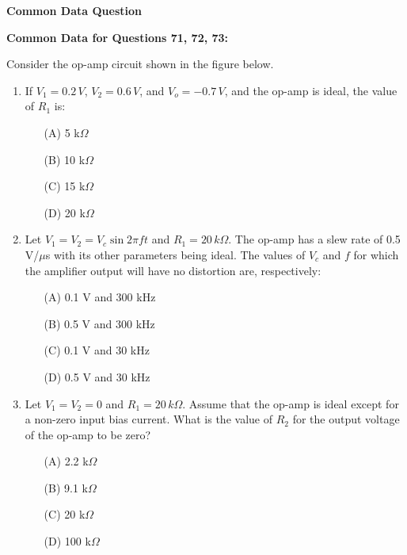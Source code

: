 \documentclass[journal]{IEEEtran}
\begin{document}
\begin{enumerate}
\begin{center}
\textbf{Common Data Question}
\end{center}

\textbf{Common Data for Questions 71, 72, 73:}

Consider the op-amp circuit shown in the figure below.
\begin{enumerate}
  \item If \( V_1 = 0.2\,V \), \( V_2 = 0.6\,V \), and \( V_o = -0.7\,V \), and the op-amp is ideal, the value of \( R_1 \) is:

  \begin{multicols}{4}
  \begin{itemize}
    \item[(A)] 5 k\(\Omega\)
    \item[(B)] 10 k\(\Omega\)
    \item[(C)] 15 k\(\Omega\)
    \item[(D)] 20 k\(\Omega\)
  \end{itemize}
  \end{multicols}

  \item Let \( V_1 = V_2 = V_c \sin 2\pi f t \) and \( R_1 = 20\,k\Omega \). The op-amp has a slew rate of 0.5 V/\(\mu\)s with its other parameters being ideal. The values of \( V_c \) and \( f \) for which the amplifier output will have no distortion are, respectively:

  \begin{multicols}{2}
  \begin{itemize}
    \item[(A)] 0.1 V and 300 kHz
    \item[(B)] 0.5 V and 300 kHz
    \item[(C)] 0.1 V and 30 kHz
    \item[(D)] 0.5 V and 30 kHz
  \end{itemize}
  \end{multicols}

  \item Let \( V_1 = V_2 = 0 \) and \( R_1 = 20\,k\Omega \). Assume that the op-amp is ideal except for a non-zero input bias current. What is the value of \( R_2 \) for the output voltage of the op-amp to be zero?

  \begin{multicols}{4}
  \begin{itemize}
    \item[(A)] 2.2 k\(\Omega\)
    \item[(B)] 9.1 k\(\Omega\)
    \item[(C)] 20 k\(\Omega\)
    \item[(D)] 100 k\(\Omega\)
  \end{itemize}
  \end{multicols}


\end{enumerate}
\end{enumerate}
\end{document}
